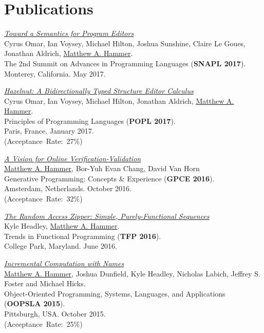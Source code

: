 \documentclass[10pt,letterpaper]{article}
\newcommand{\BeanCounter}[1]{(Acceptance~Rate:~#1\%)}
\renewenvironment{itemize}{
  \begin{list}{}{
    \setlength{\leftmargin}{1.5em}
    \setlength{\itemsep}{0.25em}
    \setlength{\parskip}{0pt}
    \setlength{\parsep}{0.25em}
  }
}{
  \end{list}
}
\begin{document}
\section*{Publications}
\begin{itemize}

\item
\href{http://hazelgrove.org/docs/hazel-vision-tr.pdf}{\textit{Toward a Semantics for Program Editors}}
\\
Cyrus Omar, Ian Voysey, Michael Hilton, Joshua Sunshine, Claire Le Goues, Jonathan Aldrich, \underline{Matthew A. Hammer}.
\\
The 2nd Summit on Advances in Programming Languages (\textbf{SNAPL 2017}).
\\
Monterey, California. May 2017.

\item
\href{https://arxiv.org/abs/1607.04180}{\textit{Hazelnut: A Bidirectionally Typed Structure Editor Calculus}}
\\
Cyrus Omar, Ian Voysey, Michael Hilton, Jonathan Aldrich, \underline{Matthew A. Hammer}.
\\
Principles of Programming Languages (\textbf{POPL 2017}).
\\
Paris, France. January 2017.
\\
\BeanCounter{27}

\item
\href{https://arxiv.org/abs/1608.06012}{\textit{A Vision for Online Verification-Validation}}
\\
\underline{Matthew A. Hammer}, Bor-Yuh Evan Chang, David Van Horn
\\
Generative Programming: Concepts \& Experience (\textbf{GPCE 2016}).
\\
Amsterdam, Netherlands. October 2016.
\\
\BeanCounter{32}

\item
\href{https://arxiv.org/abs/1608.06009}{\textit{The Random Access Zipper: Simple, Purely-Functional Sequences}}
\\
Kyle Headley, \underline{Matthew A. Hammer}.
\\
Trends in Functional Programming (\textbf{TFP 2016}).
\\
College Park, Maryland. June 2016. 

\item
\href{http://arxiv.org/abs/1503.07792}
{\textit{Incremental Computation with Names}}
\\
\underline{Matthew A. Hammer}, Joshua Dunfield, Kyle Headley, Nicholas Labich,
Jeffrey S. Foster and Michael Hicks.
\\
Object-Oriented Programming, Systems, Languages, and Applications
(\textbf{OOPSLA 2015}).
\\
Pittsburgh, USA. October 2015.
\\
\BeanCounter{25}


\end{itemize}
\end{document}

